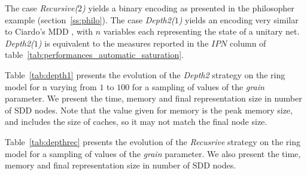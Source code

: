 The case \emph{Recursive($2$)} yields a binary encoding as presented
in the philosopher example (section~\ref{ss:philo}).  The case
\emph{Depth2($1$)} yields an encoding very similar to Ciardo's MDD
\cite{tacas03saturation}, with $n$ variables each representing the
state of a unitary net. \emph{Depth2($1$)} is equivalent to the measures reported 
in the $IPN$ column of table~\ref{tab:performances_automatic_saturation}.

Table~\ref{tab:depth1} presents the evolution of the \emph{Depth2} strategy on the ring model
for n varying from $1$ to $100$ for a sampling of values of the \emph{grain} parameter. We present 
 the time, memory and final representation size in number of SDD nodes. 
Note that the value given for memory is the peak memory size, and includes the size of caches, so it may not match
 the final node size.


Table~\ref{tab:depthrec} presents the evolution of the \emph{Recusrive} strategy on the ring model
for a sampling of values of the \emph{grain} parameter.  We also present 
 the time, memory and final representation size in number of SDD nodes. 